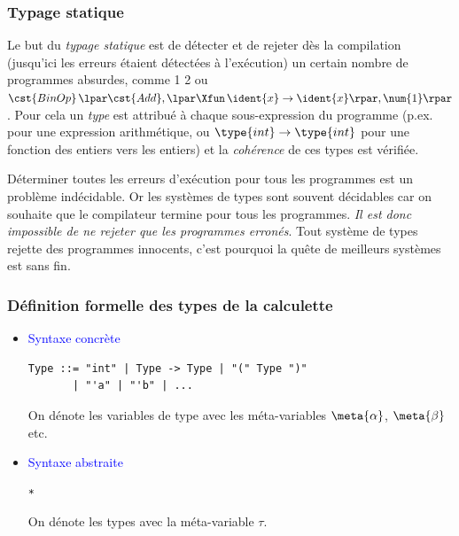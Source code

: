 
%
\begin{frame}
\frametitle{Typage statique}

Le but du \emph{typage statique} est de détecter et de rejeter dès la
compilation (jusqu'ici les erreurs étaient détectées à l'exécution) un
certain nombre de programmes absurdes, comme \num{1} \num{2} ou
$\cst{BinOp} \, \lpar\cst{Add}, \lpar\Xfun \, \ident{x} \rightarrow
\ident{x}\rpar, \num{1}\rpar$.%
Pour cela un \emph{type} est attribué à
chaque sous-expression du programme (p.ex.  pour une
expression arithmétique, ou $\type{int} \rightarrow \type{int}$ pour
une fonction des entiers vers les entiers) et la \emph{cohérence} de
ces types est vérifiée.

\bigskip

Déterminer toutes les erreurs d'exécution pour tous les programmes est
un problème indécidable. Or les systèmes de types sont souvent
décidables car on souhaite que le compilateur termine pour tous les
programmes. \emph{Il est donc impossible de ne rejeter que les
programmes erronés}. Tout système de types rejette des programmes
innocents, c'est pourquoi la quête de meilleurs systèmes est sans fin.

\end{frame}

%
\begin{frame}[containsverbatim]
\frametitle{Définition formelle des types de la calculette}

\begin{itemize}

  \item \textcolor{blue}{Syntaxe concrète}
     {\small
      \begin{verbatim}
Type ::= "int" | Type -> Type | "(" Type ")"
       | "'a" | "'b" | ...
      \end{verbatim}
    }
    \vspace*{-8pt}
    On dénote les variables de type avec les méta-variables
    $\meta{\alpha}$, $\meta{\beta}$ etc.

  \item \textcolor{blue}{Syntaxe abstraite}

    {\small
     \Xtype {} \equal {}
     \vbar{}  \Xof {} \texttt{*}
      \vbar{}  \Xof {}\semi{}
    }

    On dénote les types avec la méta-variable $\tau$.

\end{itemize}

\end{frame}

